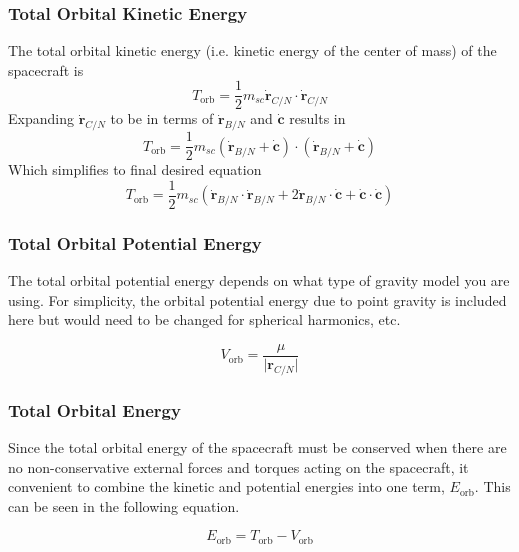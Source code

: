 \subsubsection{Total Orbital Kinetic Energy}

The total orbital kinetic energy (i.e. kinetic energy of the center of mass) of the spacecraft is
\begin{equation}
T_{\text{orb}} = \frac{1}{2} m_{sc} \dot{\bm r}_{C/N} \cdot \dot{\bm r}_{C/N}
\end{equation}
Expanding $\dot{\bm r}_{C/N}$ to be in terms of $\dot{\bm r}_{B/N}$ and $\dot{\bm c}$ results in
\begin{equation}
T_{\text{orb}} = \frac{1}{2} m_{sc} (\dot{\bm r}_{B/N} + \dot{\bm c}) \cdot (\dot{\bm r}_{B/N} + \dot{\bm c})
\end{equation}
Which simplifies to final desired equation
\begin{equation}
T_{\text{orb}} = \frac{1}{2} m_{sc} (\dot{\bm r}_{B/N}\cdot \dot{\bm r}_{B/N} + 2 \dot{\bm r}_{B/N} \cdot \dot{\bm c} + \dot{\bm c} \cdot \dot{\bm c})
\end{equation}

\subsubsection{Total Orbital Potential Energy}

The total orbital potential energy depends on what type of gravity model you are using. For simplicity, the orbital potential energy due to point gravity is included here but would need to be changed for spherical harmonics, etc.

\begin{equation}
V_{\text{orb}} = \frac{\mu}{\vert \bm r_{C/N} \vert}
\end{equation}

\subsubsection{Total Orbital Energy}

Since the total orbital energy of the spacecraft must be conserved when there are no non-conservative external forces and torques acting on the spacecraft, it convenient to combine the kinetic and potential energies into one term, $E_{\text{orb}}$. This can be seen in the following equation.

\begin{equation}
E_{\text{orb}} = T_{\text{orb}} - V_{\text{orb}}
\end{equation}

